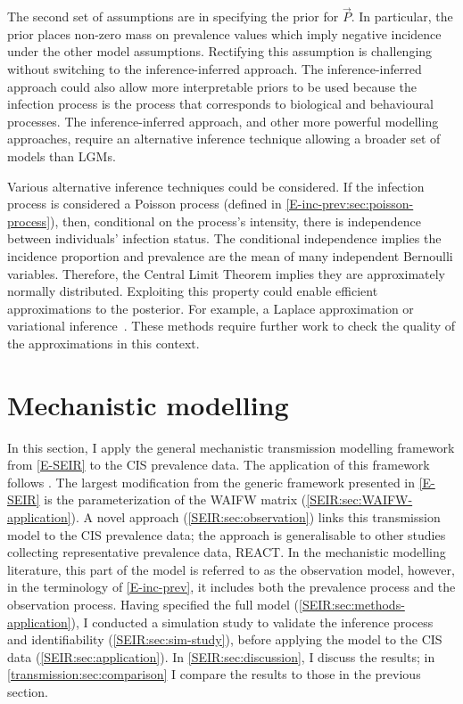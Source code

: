 \documentclass[thesis.tex]{subfiles}
\begin{document}
The second set of assumptions are in specifying the prior for $\vec{P}$.
In particular, the prior places non-zero mass on prevalence values which imply negative incidence under the other model assumptions.
Rectifying this assumption is challenging without switching to the inference-inferred approach.
The inference-inferred approach could also allow more interpretable priors to be used because the infection process is the process that corresponds to biological and behavioural processes.
The inference-inferred approach, and other more powerful modelling approaches, require an alternative inference technique allowing a broader set of models than LGMs.

Various alternative inference techniques could be considered.
If the infection process is considered a Poisson process (defined in \cref{E-inc-prev:sec:poisson-process}), then, conditional on the process's intensity, there is independence between individuals' infection status.
The conditional independence implies the incidence proportion and prevalence are the mean of many independent Bernoulli variables.
Therefore, the Central Limit Theorem implies they are approximately normally distributed.
Exploiting this property could enable efficient approximations to the posterior.
For example, a Laplace approximation or variational inference~\autocite{bleiVariational}.
These methods require further work to check the quality of the approximations in this context.


\section{Mechanistic modelling} \label{SEIR}

In this section, I apply the general mechanistic transmission modelling framework from \cref{E-SEIR} to the CIS prevalence data.
The application of this framework follows \textcite{birrellRealtime}.
The largest modification from the generic framework presented in \cref{E-SEIR} is the parameterization of the WAIFW matrix (\cref{SEIR:sec:WAIFW-application}).
A novel approach (\cref{SEIR:sec:observation}) links this transmission model to the CIS prevalence data; the approach is generalisable to other studies collecting representative prevalence data, \eg REACT.
In the mechanistic modelling literature, this part of the model is referred to as the observation model, however, in the terminology of \cref{E-inc-prev}, it includes both the prevalence process and the observation process.
Having specified the full model (\cref{SEIR:sec:methods-application}), I conducted a simulation study to validate the inference process and identifiability (\cref{SEIR:sec:sim-study}), before applying the model to the CIS data (\cref{SEIR:sec:application}).
In \cref{SEIR:sec:discussion}, I discuss the results; in \cref{transmission:sec:comparison} I compare the results to those in the previous section.
\end{document}
